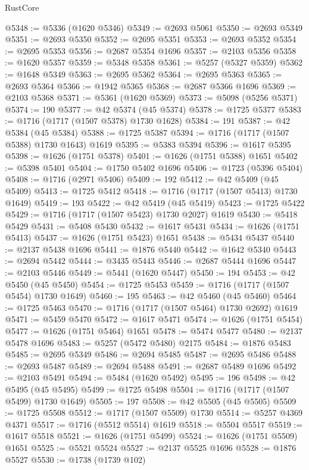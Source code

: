 \begin{lexlean}{RustCore}
\begin{coremodule}
@5348 := @5336 (@1620 @5346)
@5349 := @2693 @5061
@5350 := @2693 @5349
@5351 := @2693 @5350
@5352 := @2695 @5351
@5353 := @2693 @5352
@5354 := @2695 @5353
@5356 := @2687 @5354 @1696
@5357 := @2103 @5356
@5358 := @1620 @5357
@5359 := @5348 @5358
@5361 := @5257 (@5327 @5359)
@5362 := @1648 @5349
@5363 := @2695 @5362
@5364 := @2695 @5363
@5365 := @2693 @5364
@5366 := @1942 @5365
@5368 := @2687 @5366 @1696
@5369 := @2103 @5368
@5371 := @5361 (@1620 @5369)
@5373 := @5098 (@5256 @5371)
@5374 := 190
@5377 := @42 @5374 (@45 @5374)
@5378 := @1725 @5377
@5383 := @1716 (@1717 (@1507 @5378) @1730 @1628)
@5384 := 191
@5387 := @42 @5384 (@45 @5384)
@5388 := @1725 @5387
@5394 := @1716 (@1717 (@1507 @5388) @1730 @1643) @1619
@5395 := @5383 @5394
@5396 := @1617 @5395
@5398 := @1626 (@1751 @5378)
@5401 := @1626 (@1751 @5388) @1651
@5402 := @5398 @5401
@5404 := @1750 @5402 @1696
@5406 := @1723 (@5396 @5404)
@5408 := @1716 (@2971 @5406)
@5409 := 192
@5412 := @42 @5409 (@45 @5409)
@5413 := @1725 @5412
@5418 := @1716 (@1717 (@1507 @5413) @1730 @1649)
@5419 := 193
@5422 := @42 @5419 (@45 @5419)
@5423 := @1725 @5422
@5429 := @1716 (@1717 (@1507 @5423) @1730 @2027) @1619
@5430 := @5418 @5429
@5431 := @5408 @5430
@5432 := @1617 @5431
@5434 := @1626 (@1751 @5413)
@5437 := @1626 (@1751 @5423) @1651
@5438 := @5434 @5437
@5440 := @2137 @5438 @1696
@5441 := @1876 @5440
@5442 := @1642 @5340
@5443 := @2694 @5442
@5444 := @3435 @5443
@5446 := @2687 @5444 @1696
@5447 := @2103 @5446
@5449 := @5441 (@1620 @5447)
@5450 := 194
@5453 := @42 @5450 (@45 @5450)
@5454 := @1725 @5453
@5459 := @1716 (@1717 (@1507 @5454) @1730 @1649)
@5460 := 195
@5463 := @42 @5460 (@45 @5460)
@5464 := @1725 @5463
@5470 := @1716 (@1717 (@1507 @5464) @1730 @2692) @1619
@5471 := @5459 @5470
@5472 := @1617 @5471
@5474 := @1626 (@1751 @5454)
@5477 := @1626 (@1751 @5464) @1651
@5478 := @5474 @5477
@5480 := @2137 @5478 @1696
@5483 := @5257 (@5472 @5480) @2175
@5484 := @1876 @5483
@5485 := @2695 @5349
@5486 := @2694 @5485
@5487 := @2695 @5486
@5488 := @2693 @5487
@5489 := @2694 @5488
@5491 := @2687 @5489 @1696
@5492 := @2103 @5491
@5494 := @5484 (@1620 @5492)
@5495 := 196
@5498 := @42 @5495 (@45 @5495)
@5499 := @1725 @5498
@5504 := @1716 (@1717 (@1507 @5499) @1730 @1649)
@5505 := 197
@5508 := @42 @5505 (@45 @5505)
@5509 := @1725 @5508
@5512 := @1717 (@1507 @5509) @1730
@5514 := @5257 @4369 @4371
@5517 := @1716 (@5512 @5514) @1619
@5518 := @5504 @5517
@5519 := @1617 @5518
@5521 := @1626 (@1751 @5499)
@5524 := @1626 (@1751 @5509) @1651
@5525 := @5521 @5524
@5527 := @2137 @5525 @1696
@5528 := @1876 @5527
@5530 := @1738 (@1739 @102)

\end{coremodule}
\end{lexlean}
